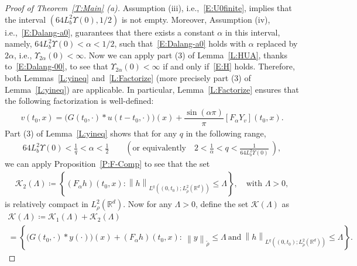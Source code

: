 \documentclass[sn-mathphys]{sn-jnl}%
\renewcommand{\R}{\mathbb{R}}
\newcommand{\Norm}[1]{\left\| #1 \right\|}
\numberwithin{equation}{section}
\theoremstyle{thmstyleone}%
\theoremstyle{thmstyletwo}%
\theoremstyle{thmstylethree}%
\begin{document}
\begin{proof}[Proof of Theorem~\ref{T:Main} (a)]
  Assumption (iii), i.e.,~\eqref{E:U0finite}, implies that the interval $\left(64L_b^2 \Upsilon(0),
  1/2\right)$ is not empty. Moreover, Assumption (iv), i.e.,~\eqref{E:Dalang-a0}, guarantees that
  there exists a constant $\alpha$ in this interval, namely, $64L_b^2\Upsilon(0) <\alpha<1/2$, such
  that~\eqref{E:Dalang-a0} holds with $\alpha$ replaced by $2\alpha$, i.e.,
  $\Upsilon_{2\alpha}(0)<\infty$. Now we can apply part (3) of Lemma~\ref{L:HUA}, thanks
  to~\eqref{E:Dalang-00}, to see that $\Upsilon_{2\alpha}(0)<\infty$ if and only if~\eqref{E:H}
  holds. Therefore, both Lemmas~\ref{L:yineq} and~\ref{L:Factorize} (more precisely part (3) of
  Lemma~\ref{L:yineq}) are applicable. In particular, Lemma~\ref{L:Factorize} ensures that the
  following factorization is well-defined:
  \begin{align}\label{E:Fact}
    v(t_0,x) = \Big(G(t_0,\cdot) * u(t-t_0,\cdot)\Big)(x) +\dfrac{\sin(\alpha \pi)}{\pi} \left[F_\alpha Y_v\right](t_0,x).
  \end{align}
  Part (3) of Lemma~\ref{L:yineq} shows that for any $q$ in the following range,
  \begin{align}\label{E:Choice}
    64 L_b^2 \Upsilon(0) < \frac{1}{q} < \alpha <\frac{1}{2}
    \qquad \left(\text{or equivalently} \quad
    2< \frac{1}{\alpha} < q < \frac{1}{64 L_b^2 \Upsilon(0)}\:\right),
  \end{align}
  we can apply Proposition~\ref{P:F-Comp} to see that the set
  \begin{align*}
    \mathscr{K}_2 (\Lambda)\coloneqq
    \left\{(F_\alpha h)(t_0,x): \Norm{h}_{L^q\left((0,t_0);L^2_{\tilde{\rho}}\left(\R^d\right)\right)} \le \Lambda \right\},
    \quad \text{with $\Lambda>0$},
  \end{align*}
  is relatively compact in $L_\rho^2 (\R^d)$. Now for any $\Lambda>0$, define the set $\mathscr{K}
  (\Lambda)$ as
  \begin{multline*}
    \mathscr{K} (\Lambda) \coloneqq \mathscr{K}_1 (\Lambda) + \mathscr{K}_2 (\Lambda) \\
    = \left\{\big(G(t_0,\cdot)*y(\cdot)\big)(x)+(F_\alpha h)(t_0, x): \:\Norm{y}_{\tilde{\rho}}
    \le \Lambda~\text{and}~\Norm{h}_{L^q\left((0,t_0);L^2_{\tilde{\rho}}\left(\R^d\right)\right)} \le \Lambda \right\}.
  \end{multline*}


\end{proof}
\end{document}
